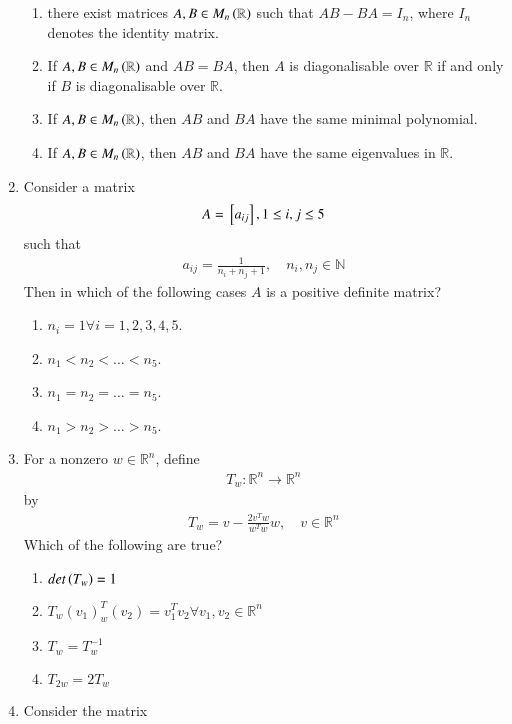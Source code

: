 \begin{enumerate}[label=\thesection.\arabic*.,ref=\thesection.\theenumi]
\begin{enumerate}
\item there exist matrices $A,B \in M_n\left(\mathbb{R}\right)$ such that $AB- BA = I_n$, where $I_n$ denotes the identity matrix.
\item If $A,B \in M_n\left(\mathbb{R}\right)$ and $AB = BA$, then $A$ is diagonalisable over $\mathbb{R}$ if and only if $B$ is diagonalisable over $\mathbb{R}$.
\item If $A,B \in M_n\left(\mathbb{R}\right)$, then $AB$ and $BA$ have the same minimal polynomial.
\item If $A,B \in M_n\left(\mathbb{R}\right)$, then $AB$ and $BA$ have the same eigenvalues in $\mathbb{R}$.
\end{enumerate}
\solution

\item Consider a matrix 
\begin{align}
A = {}\left[a_{ij}\right], 1 \le i,j \le 5
\end{align}
such that
\begin{align}
a_{ij} = \frac{1}{n_i+n_j+1}, \quad n_i,n_j \in \mathbb{N}
\end{align}
Then in which of the following cases $A$ is a positive definite matrix?
\begin{enumerate}
\item $n_i = 1 \forall i = 1,2,3,4,5$.
\item $n_1 < n_2 < \dots < n_5$.
\item $n_1 = n_2 = \dots = n_5$.
\item $n_1 > n_2 > \dots > n_5$.
\end{enumerate}
\item For a nonzero $w \in \mathbb{R}^n$, define
\begin{align}
T_w: \mathbb{R}^n \to \mathbb{R}^n
\end{align}
by
\begin{align}
T_w = v - \frac{2v^Tw}{w^Tw}w, \quad v \in \mathbb{R}^n
\end{align}
Which of the following are true?
\begin{enumerate}
\item $det\left(T_w\right) = 1$
\item $T_w(v_1)^T_w(v_2) = v_1^Tv_2 \forall v_1, v_2 \in \mathbb{R}^n$
\item  $T_w = T_w ^{-1}$
\item  $T_{2w} = 2T_{w}$
\end{enumerate}
\item Consider the matrix 
\begin{align}

\end{align}
\end{enumerate}
